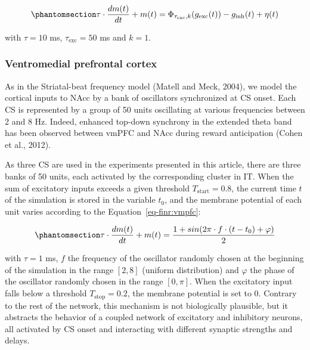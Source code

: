 \documentclass[
  11pt,
  a4paper,
]{scrbook}
\begin{document}
\begin{equation}\phantomsection\label{eq-finr:pptn}{\tau \cdot \frac{dm(t)}{dt} +  m(t) = \Phi_{ \tau_{\text{exc}}, k } ( g_{\text{exc}}(t) ) - g_{\text{inh}}(t) + \eta(t)
}\end{equation}

with \(\tau=10\) ms, \(\tau_{\text{exc}} = 50\) ms and \(k=1\).

\subsubsection*{Ventromedial prefrontal
cortex}\label{ventromedial-prefrontal-cortex}

As in the Striatal-beat frequency model (Matell and Meck, 2004), we
model the cortical inputs to NAcc by a bank of oscillators synchronized
at CS onset. Each CS is represented by a group of 50 units oscillating
at various frequencies between 2 and 8 Hz. Indeed, enhanced top-down
synchrony in the extended theta band has been observed between vmPFC and
NAcc during reward anticipation (Cohen et al., 2012).

As three CS are used in the experiments presented in this article, there
are three banks of 50 units, each activated by the corresponding cluster
in IT. When the sum of excitatory inputs exceeds a given threshold
\(T_{\text{start}} = 0.8\), the current time \(t\) of the simulation is
stored in the variable \(t_0\), and the membrane potential of each unit
varies according to the Equation~\ref{eq-finr:vmpfc}:

\begin{equation}\phantomsection\label{eq-finr:vmpfc}{
    \tau \cdot \frac{dm(t)}{dt} +  m(t) = \frac{1 + sin(2\pi\cdot f \cdot (t-t_0) + \varphi)}{2}
}\end{equation}

with \(\tau = 1\) ms, \(f\) the frequency of the oscillator randomly
chosen at the beginning of the simulation in the range \([2, 8]\)
(uniform distribution) and \(\varphi\) the phase of the oscillator
randomly chosen in the range \([0, \pi]\). When the excitatory input
falls below a threshold \(T_{\text{stop}} = 0.2\), the membrane
potential is set to 0. Contrary to the rest of the network, this
mechanism is not biologically plausible, but it abstracts the behavior
of a coupled network of excitatory and inhibitory neurons, all activated
by CS onset and interacting with different synaptic strengths and
delays.
\end{document}
